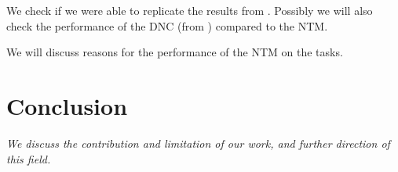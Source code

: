 \documentclass[12pt,twoside]{article}
\theoremstyle{plain}
\theoremstyle{definition}
\theoremstyle{remark}
\begin{document}
We check if we were able to replicate the results from \cite{implementing-ntm}. Possibly we will also check the performance of the DNC (from \cite{original-dnc}) compared to the NTM.

We will discuss reasons for the performance of the NTM on the tasks.

\section{Conclusion}
\textit{We discuss the contribution and limitation of our work, and further direction of this field.}

%
\newpage


\end{document}
